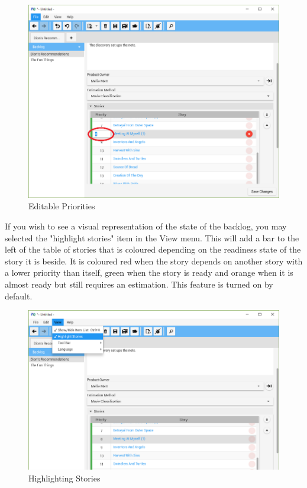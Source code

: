\begin{figure}[H]
\centering
\includegraphics[width=\textwidth]{images/screenshots/editable_priority.PNG}
\caption{Editable Priorities}
\label{fig:new_project}
\end{figure}

\bigskip
If you wish to see a visual representation of the state of the backlog, you may selected the "highlight stories" item in the View menu. This will add a bar to the left of the table of stories that is coloured depending on the readiness state of the story it is beside. It is coloured red when the story depends on another story with a lower priority than itself, green when the story is ready and orange when it is almost ready but still requires an estimation. This feature is turned on by default.

\begin{figure}[H]
\centering
\includegraphics[width=\textwidth]{images/screenshots/story_highlighting.PNG}
\caption{Highlighting Stories}
\label{fig:new_project}
\end{figure}

